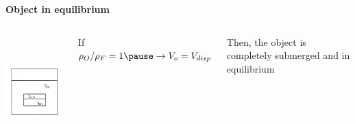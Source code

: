\documentclass[]{beamer}
\begin{document}
 \begin{frame}


   \textbf{Object in equilibrium} 
  
   \vspace{3mm}
  
   \begin{columns}[c]
      \column{2in}  %
  
      \begin{center}
     \includegraphics[height=1.7in]{images2/Buoyance3b.jpg}
   \end{center}
   
      \column{2in}
  
   
      If   $\rho_O/\rho_{F }=1\pause\rightarrow V_o=V_{disp}$ 

      \pause

      \vspace{3mm}

      Then, the object is completely submerged and in equilibrium

      \end{columns}
  
  
  
     \end{frame}
\end{document}

